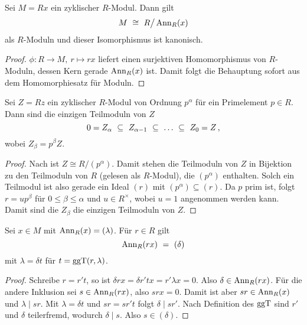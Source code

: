 \begin{lemma}
  \label{lemma:zyklischer_modul_iso}
  Sei $M = Rx$ ein zyklischer $R$-Modul. Dann gilt
  \[M \ \cong\  R\big/\operatorname{Ann}_R(x)\]
  als $R$-Moduln und dieser Isomorphismus ist kanonisch.
\end{lemma}
\begin{proof}
  $\phi:R \to M,\ r \mapsto rx$ liefert einen surjektiven Homomorphismus von
  $R$-Moduln, dessen Kern gerade $\operatorname{Ann}_R(x)$ ist. Damit folgt die Behauptung
  sofort aus dem Homomorphiesatz für Moduln.
\end{proof}

\begin{lemma}
  \label{lemma:teilmoduln_prim_moduln}
  Sei $Z = Rz$ ein zyklischer $R$-Modul von Ordnung $p^\alpha$ für ein
  Primelement $p\in R$. Dann sind die einzigen Teilmoduln von $Z$
  \[ 0 = Z_\alpha \ \subseteq\  Z_{\alpha-1} \ \subseteq\  \ldots
    \ \subseteq\  Z_0 = Z \,,\]
  wobei $Z_\beta = p^\beta Z$.
\end{lemma}
\begin{proof}
  Nach  ist $Z \cong R\big/(p^\alpha)$. Damit
  stehen die Teilmoduln von $Z$ in Bijektion zu den Teilmoduln von
  $R$ (gelesen als $R$-Modul), die $(p^\alpha)$ enthalten. Solch ein
  Teilmodul ist also gerade ein Ideal $(r)$ mit 
  $(p^\alpha)\subseteq (r)$. Da $p$ prim ist, folgt $r = up^\beta$ für
  $0\leq\beta \leq \alpha$ und $u\in R^\times$, wobei $u=1$ \obda angenommen
  werden kann. Damit sind die $Z_\beta$ die einzigen Teilmoduln von $Z$.
\end{proof}



\begin{lemma}
  \label{lemma:annihilator_ggt}
  Sei $x \in M$ mit $\operatorname{Ann}_R(x) = (\lambda)$. Für $r \in R$ gilt
  \[ \operatorname{Ann}_R(rx) \ =\  (\delta) \]
  mit $\lambda = \delta t$ für $t = \operatorname{ggT}(r,\lambda)$.
\end{lemma}
\begin{proof}
  Schreibe $r = r't$, so ist $\delta rx = \delta r'tx = r'\lambda x = 0$. Also
  $\delta \in \operatorname{Ann}_R(rx)$. Für die andere Inklusion sei $s \in \operatorname{Ann}_R(rx)$,
  also $srx = 0$. Damit ist aber $sr \in \operatorname{Ann}_R(x)$ und
  $\lambda \mid sr$. Mit $\lambda = \delta t$ und $sr = sr't$ folgt
  $\delta \mid sr'$.
  Nach Definition des $\operatorname{ggT}$ sind $r'$ und $\delta$ teilerfremd, wodurch
  $\delta \mid s$. Also $s \in (\delta)$.
\end{proof}



